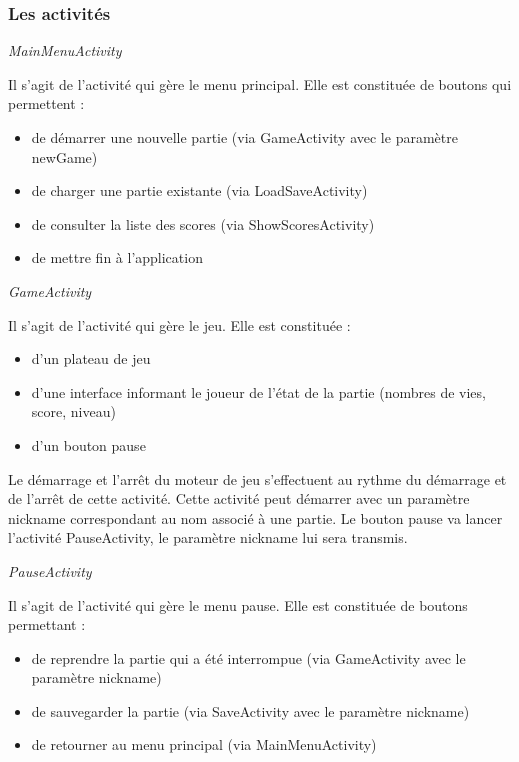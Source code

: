 \documentclass{article}
\begin{document}
\subsubsection{Les activités}

\medskip

\textit{MainMenuActivity}

Il s’agit de l’activité qui gère le menu principal. Elle est constituée de boutons qui permettent :
\begin{itemize}
\item de démarrer une nouvelle partie (via GameActivity avec le paramètre newGame)
\item de charger une partie existante (via LoadSaveActivity)
\item de consulter la liste des scores (via ShowScoresActivity)
\item de mettre fin à l’application
\end{itemize}

\medskip

\textit{GameActivity}

Il s’agit de l’activité qui gère le jeu. Elle est constituée :
\begin{itemize}
\item d’un plateau de jeu
\item d’une interface informant le joueur de l’état de la partie (nombres de vies, score, niveau)
\item d’un bouton pause
\end{itemize}
Le démarrage et l’arrêt du moteur de jeu s’effectuent au rythme du démarrage et de l’arrêt de cette activité. Cette activité peut démarrer avec un paramètre nickname correspondant au nom associé à une partie.
Le bouton pause va lancer l'activité PauseActivity, le 
paramètre nickname lui sera transmis.

\medskip

\textit{PauseActivity}

Il s’agit de l’activité qui gère le menu pause. Elle est constituée de boutons permettant :
\begin{itemize}
\item de reprendre la partie qui a été interrompue (via GameActivity avec le paramètre nickname)
\item de sauvegarder la partie (via SaveActivity avec le paramètre nickname)
\item de retourner au menu principal (via MainMenuActivity)
\end{itemize}
\end{document}

